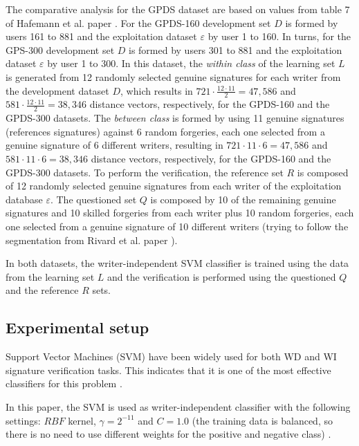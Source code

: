 \documentclass[conference]{IEEEtran}
\begin{document}
The comparative analysis for the GPDS dataset are based on values from table 7 of Hafemann et al. paper \cite{hafemann:17}. 
For the GPDS-160 development set $D$ is formed by users 161 to 881 and the exploitation dataset $\varepsilon$ by user 1 to 160.
In turns, for the GPS-300 development set $D$ is formed by users 301 to 881 and the exploitation dataset $\varepsilon$ by user 1 to 300.
In this dataset, the \textit{within class} of the learning set $L$ is generated from 12 randomly selected genuine signatures for each writer from the development dataset $D$, which results in $721 \cdot \frac{12 \cdot 11}{2} = 47,586$ and $581 \cdot \frac{12 \cdot 11}{2} = 38,346$ distance vectors, respectively, for the GPDS-160 and the GPDS-300 datasets.
The \textit{between class} is formed by using 11 genuine signatures (references signatures) against 6 random forgeries, each one selected from a genuine signature of 6 different writers, resulting in $721 \cdot 11 \cdot 6 = 47,586$ and $581 \cdot 11 \cdot 6 = 38,346$ distance vectors, respectively, for the GPDS-160 and the GPDS-300 datasets. To perform the verification, the reference set $R$ is composed of 12 randomly selected genuine signatures from each writer of the exploitation database $\varepsilon$. The questioned set $Q$ is composed by 10 of the remaining genuine signatures and 10 skilled forgeries from each writer plus 10 random forgeries, each one selected from a genuine signature of 10 different writers (trying to follow the segmentation from Rivard et al. paper \cite{rivard:13}). 


In both datasets, the writer-independent SVM classifier is trained using the data from the learning set $L$ and the verification is performed using the questioned $Q$ and the reference $R$ sets.


\subsection{Experimental setup}


Support Vector Machines (SVM) have been widely used for both WD and WI signature verification tasks. This indicates that it is one of the most effective classifiers for this problem \cite{hafemann_review:17}.


In this paper, the SVM is used as writer-independent classifier with the following settings: $RBF$ kernel, $\gamma = 2^{-11}$ and $C=1.0$ (the training data is balanced, so there is no need to use different weights for the positive and negative class) \cite{hafemann:17}. 
\end{document}
